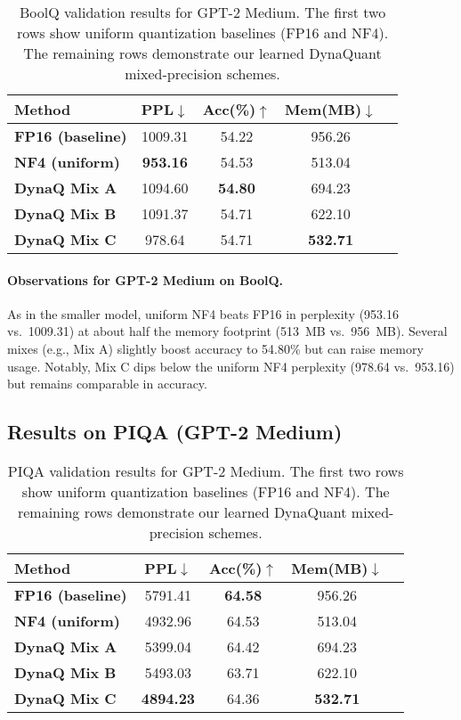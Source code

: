 \documentclass{article}
\begin{document}
	\begin{table}[ht]
		\centering
		\label{tab:boolq-medium}
		\begin{tabular}{lcccc}
			\toprule
			\textbf{Method} & \textbf{PPL}$\downarrow$ & \textbf{Acc(\%)}$\uparrow$ & \textbf{Mem(MB)}$\downarrow$ \\
			\midrule
			\textbf{FP16 (baseline)}  & 1009.31 & 54.22 & 956.26 \\
			\textbf{NF4 (uniform)}    & \textbf{953.16}  & 54.53 & 513.04 \\
			\midrule
			\textbf{DynaQ Mix A}      & 1094.60 & \textbf{54.80} & 694.23 \\
			\textbf{DynaQ Mix B}      & 1091.37 & 54.71 & 622.10 \\
			\textbf{DynaQ Mix C}      & 978.64  & 54.71 & \textbf{532.71} \\
			\bottomrule
		\end{tabular}
		\caption{\small BoolQ validation results for GPT-2 Medium. The first two rows show uniform quantization baselines (FP16 and NF4). The remaining rows demonstrate our learned DynaQuant mixed-precision schemes.}
	\end{table}
	
	\paragraph{Observations for GPT-2 Medium on BoolQ.}
	As in the smaller model, uniform NF4 beats FP16 in perplexity (953.16 vs.\ 1009.31) at about half the memory footprint (513~MB vs.\ 956~MB). Several mixes (e.g., Mix A) slightly boost accuracy to 54.80\% but can raise memory usage. Notably, Mix C dips below the uniform NF4 perplexity (978.64 vs.\ 953.16) but remains comparable in accuracy.
	
	\subsection{Results on PIQA (GPT-2 Medium)}
	
	\begin{table}[ht]
		\centering
		\label{tab:piqa-medium}
		\begin{tabular}{lcccc}
			\toprule
			\textbf{Method} & \textbf{PPL}$\downarrow$ & \textbf{Acc(\%)}$\uparrow$ & \textbf{Mem(MB)}$\downarrow$ \\
			\midrule
			\textbf{FP16 (baseline)} & 5791.41 & \textbf{64.58} & 956.26 \\
			\textbf{NF4 (uniform)}   & 4932.96 & 64.53 & 513.04 \\
			\midrule
			\textbf{DynaQ Mix A}     & 5399.04 & 64.42 & 694.23 \\
			\textbf{DynaQ Mix B}     & 5493.03 & 63.71 & 622.10 \\
			\textbf{DynaQ Mix C}     & \textbf{4894.23} & 64.36 & \textbf{532.71} \\
			\bottomrule
		\end{tabular}
		\caption{\small PIQA validation results for GPT-2 Medium. The first two rows show uniform quantization baselines (FP16 and NF4). The remaining rows demonstrate our learned DynaQuant mixed-precision schemes.}
	\end{table}
	
\end{document}
